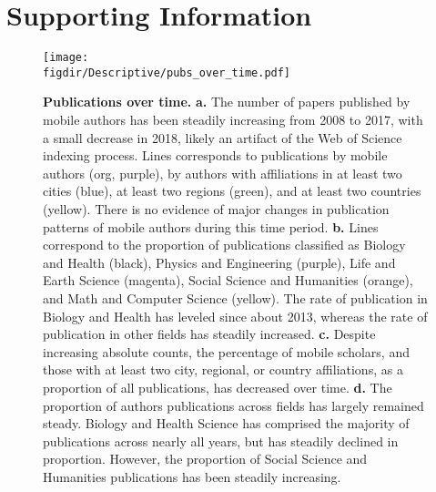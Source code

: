 \documentclass[12pt]{article} %
\def\figdir{../Figs}
\newcommand{\beginsupplement}{%
        \setcounter{table}{0}
        \renewcommand{\thetable}{S\arabic{table}}%
        \setcounter{figure}{0}
        \renewcommand{\thefigure}{S\arabic{figure}}%
     }
\begin{document}
\newpage
\clearpage
\beginsupplement
\section{Supporting Information}



%
%
\begin{figure}[p!]
	\centering
	\label{fig:supp:pubs_over_time}
	\texttt{[image: \\figdir/Descriptive/pubs\_over\_time.pdf]}
	\caption{
		\textbf{Publications over time.}
		\textbf{a.}
		The number of papers published by mobile authors has been steadily increasing from 2008 to 2017, with a small decrease in 2018,  likely an artifact of the Web of Science indexing process.
		Lines corresponds to publications by mobile authors (org, purple), by authors with affiliations in at least two cities (blue), at least two regions (green), and at least two countries (yellow).
		There is no evidence of major changes in publication patterns of mobile authors during this time period. 
		\textbf{b.}
		Lines correspond to the proportion of publications classified as Biology and Health (black), Physics and Engineering (purple), Life and Earth Science (magenta), Social Science and Humanities (orange), and Math and Computer Science (yellow).
		The rate of publication in Biology and Health has leveled since about 2013, whereas the rate of publication in other fields has steadily increased. 
		\textbf{c.} 
		Despite increasing absolute counts, the percentage of mobile scholars, and those with at least two city, regional, or country affiliations, as a proportion of all publications, has decreased over time. 
		\textbf{d.} 
		The proportion of authors publications across fields has largely remained steady.
		Biology and Health Science has comprised the majority of publications across nearly all years, but has steadily declined in proportion. 
		However, the proportion of Social Science and Humanities publications has been steadily increasing. 
	}
\end{figure}
\end{document}
